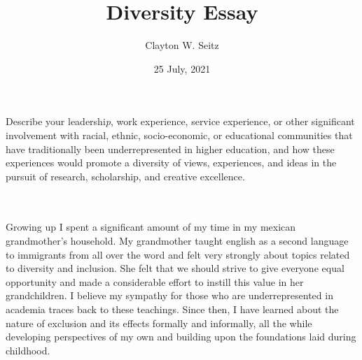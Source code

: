 \documentclass{article}
\title{Diversity Essay}
\author{Clayton W. Seitz}
\date{25 July, 2021}
\begin{document}
  \maketitle%
\vspace{0.4in}

Describe your leadershi\textit{p}, work experience, service experience, or other significant involvement with racial, ethnic, socio-economic, or educational communities that have traditionally been underrepresented in higher education, and how these experiences would promote a diversity of views, experiences, and ideas in the pursuit of research, scholarship, and creative excellence.\\\\\

	Growing up I spent a significant amount of my time in my mexican grandmother’s household. My grandmother taught english as a second language to immigrants from all over the word and felt very strongly about topics related to diversity and inclusion. She felt that we should strive to give everyone equal opportunity and made a considerable effort to instill this value in her grandchildren. I believe my sympathy for those who are underrepresented in academia traces back to these teachings. Since then, I have learned about the nature of exclusion and its effects formally and informally, all the while developing perspectives of my own and building upon the foundations laid during childhood.
	
\end{document}
